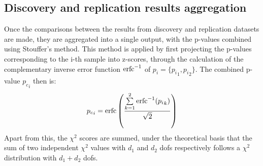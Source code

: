 \subsection{Discovery and replication results aggregation}
Once the comparisons between the results from discovery and replication datasets are made, they are aggregated into a single output, with the p-values combined using Stouffer's method. This method is applied by first projecting the p-values corresponding to the i-th sample into z-scores, through the calculation of the complementary inverse error function $\operatorname*{erfc}^{-1}$ of $p_i=\{{p_i}_1,{p_i}_2\}$. The combined p-value ${p_c}_i$ then is:
$$
 {p_c}_i= \operatorname*{erfc}\left(\frac{\sum\limits_{k=1}^2 \operatorname*{erfc}^{-1}({p_i}_k)}{\sqrt{2}}\right)
$$
Apart from this, the $\chi^2$ scores are summed, under the theoretical basis that the sum of two independent $\chi^2$ values with $d_1$ and $d_2$ \acp{dof} respectively follows a $\chi^2$ distribution with $d_1+d_2$ \acp{dof}.

